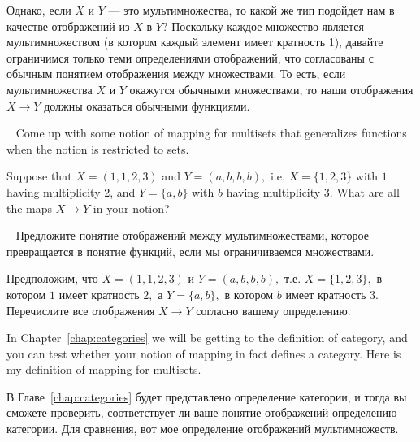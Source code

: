 \documentclass[CT4S-EN-RU]{subfiles}
\begin{document}
\begin{blockRUS}
Однако, если $X$ и $Y$ — это мультимножества, то какой же тип подойдет нам в качестве отображений из $X$ в $Y?$ Поскольку каждое множество является мультимножеством (в котором каждый элемент имеет кратность 1), давайте ограничимся только теми определениями отображений, что согласованы с обычным понятием отображения между множествами. То есть, если мультимножества $X$ и $Y$ окажутся обычными множествами, то наши отображения $X\to Y$ должны оказаться обычными функциями. 
\end{blockRUS}

\begin{exerciseENG}\label{exc:multiset 1}~
\sexc Come up with some notion of mapping for multisets that generalizes functions when the notion is restricted to sets. 
\item Suppose that $X=(1,1,2,3)$ and $Y=(a,b,b,b),$ i.e. $X=\{1,2,3\}$ with $1$ having multiplicity 2, and $Y=\{a,b\}$ with $b$ having multiplicity 3. What are all the maps $X\to Y$ in your notion?
\endsexc
\end{exerciseENG}

\begin{exerciseRUS}\label{exc:multiset 1}~
\sexc Предложите понятие отображений между мультимножествами, которое превращается в понятие функций, если мы ограничиваемся множествами. 
\item Предположим, что $X=(1,1,2,3)$ и $Y=(a,b,b,b),$ т.е. $X=\{1,2,3\},$ в котором $1$ имеет кратность $2,$ а $Y=\{a,b\},$ в котором $b$ имеет кратность $3.$ Перечислите все отображения $X\to Y$ согласно вашему определению.
\endsexc
\end{exerciseRUS}

\begin{blockENG}
In Chapter~\ref{chap:categories} we will be getting to the definition of category, and you can test whether your notion of mapping in fact defines a category. Here is my definition of mapping for multisets.
\end{blockENG}

\begin{blockRUS}
В Главе~\ref{chap:categories} будет представлено определение категории, и тогда вы сможете проверить, соответствует ли ваше понятие отображений определению категории. Для сравнения, вот мое определение отображений мультимножеств.
\end{blockRUS}
\end{document}
